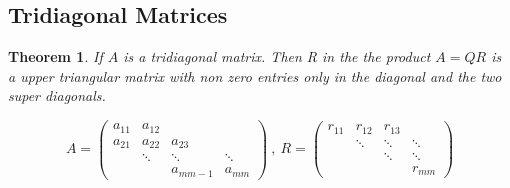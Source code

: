 \documentclass{article}
\numberwithin{pic}{section}
\numberwithin{lem}{section}
\newtheorem{thm}{Theorem}
\numberwithin{thm}{section}
\numberwithin{cor}{section}
\theoremstyle{definition}
\numberwithin{ex}{section}
\numberwithin{defn}{section}
\theoremstyle{definition}
\theoremstyle{remark}
\begin{document}
\subsection{Tridiagonal Matrices}
\begin{thm}
If $A$ is a tridiagonal matrix. Then R in the the product $A=QR$ is a upper triangular matrix with non zero entries only in the diagonal and the two super diagonals.
\end{thm}
\[A=\begin{pmatrix}
a_{11} & a_{12} &  &   \\ 
a_{21} & a_{22} & a_{23} &    \\ 
 & \ddots & \ddots & \ddots   \\ 
   &  & a_{m m-1} & a_{mm}
\end{pmatrix}~,~R=\begin{pmatrix}
r_{11} & r_{12} & r_{13} &  \\ 
 & \ddots & \ddots & \ddots \\ 
 &  & \ddots & \ddots \\ 
 &  &  & r_{mm}
\end{pmatrix}  \]
\end{document}

